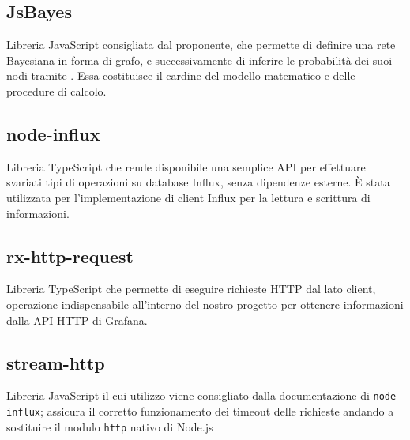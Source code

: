 \subsection{JsBayes}
Libreria JavaScript consigliata dal proponente, che permette di definire una rete Bayesiana in forma di grafo, e successivamente di inferire le probabilità dei suoi nodi tramite . Essa costituisce il cardine del modello matematico e delle procedure di calcolo.

\subsection{node-influx}
Libreria TypeScript che rende disponibile una semplice API per effettuare svariati tipi di operazioni su database Influx, senza dipendenze esterne. È stata utilizzata per l'implementazione di client Influx per la lettura e scrittura di informazioni.

\subsection{rx-http-request}
Libreria TypeScript che permette di eseguire richieste HTTP dal lato client, operazione indispensabile all'interno del nostro progetto per ottenere informazioni dalla API HTTP di Grafana. 

\subsection{stream-http}
Libreria JavaScript il cui utilizzo viene consigliato dalla documentazione di \texttt{node-influx}; assicura il corretto funzionamento dei timeout delle richieste andando a sostituire il modulo \texttt{http} nativo di Node.js